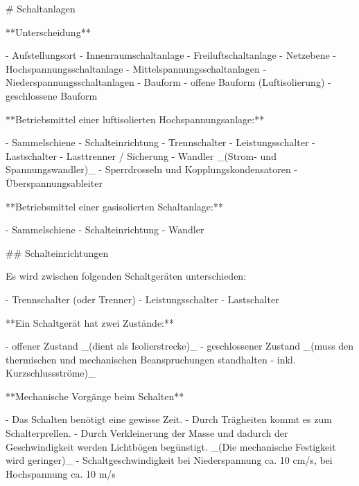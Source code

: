 \begin{markdown}
# Schaltanlagen


**Unterscheidung**

- Aufstellungsort
    - Innenraumschaltanlage
    - Freiluftschaltanlage
- Netzebene
    - Hochspannungsschaltanlage
    - Mittelspannungsschaltanlagen
    - Niederspannungsschaltanlagen
- Bauform
    - offene Bauform (Luftisolierung)
    - geschlossene Bauform

**Betriebsmittel einer luftisolierten Hochspannungsanlage:**

- Sammelschiene
- Schalteinrichtung
    - Trennschalter
    - Leistungsschalter
    - Lastschalter
    - Lasttrenner / Sicherung
- Wandler _(Strom- und Spannungswandler)_
- Sperrdrosseln und Kopplungskondensatoren 
- Überspannungsableiter

**Betriebsmittel einer gasisolierten Schaltanlage:**

- Sammelschiene
- Schalteinrichtung
- Wandler

## Schalteinrichtungen


Es wird zwischen folgenden Schaltgeräten unterschieden:

- Trennschalter (oder Trenner)
- Leistungsschalter
- Lastschalter

**Ein Schaltgerät hat zwei Zustände:**

- offener Zustand _(dient als Isolierstrecke)_
- geschlossener Zustand _(muss den thermischen und mechanischen Beanspruchungen standhalten - inkl. Kurzschlussströme)_

**Mechanische Vorgänge beim Schalten**

- Das Schalten benötigt eine gewisse Zeit.
- Durch Trägheiten kommt es zum Schalterprellen.
- Durch Verkleinerung der Masse und dadurch der Geschwindigkeit werden Lichtbögen begünstigt. _(Die mechanische Festigkeit wird geringer)_ 
- Schaltgeschwindigkeit bei Niederspannung ca. 10 cm/s, bei Hochspannung ca. 10 m/s


\end{markdown}
